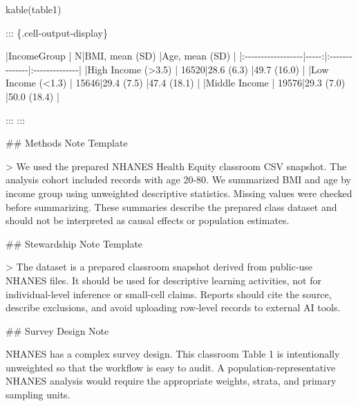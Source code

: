 \documentclass[
  letterpaper,
  DIV=11,
  numbers=noendperiod,
  oneside]{scrreprt}
\newenvironment{Shaded}{\begin{snugshade}}{\end{snugshade}}
\newcommand{\AttributeTok}[1]{\textcolor[rgb]{0.40,0.45,0.13}{#1}}
\newcommand{\FunctionTok}[1]{\textcolor[rgb]{0.28,0.35,0.67}{#1}}
\newcommand{\InformationTok}[1]{\textcolor[rgb]{0.37,0.37,0.37}{#1}}
\newcommand{\NormalTok}[1]{\textcolor[rgb]{0.00,0.23,0.31}{#1}}
\newcommand{\PreprocessorTok}[1]{\textcolor[rgb]{0.68,0.00,0.00}{#1}}
\begin{document}
\begin{Shaded}
\begin{Highlighting}[numbers=left,,]
\FunctionTok{kable}\NormalTok{(table1)}
\InformationTok{\textasciigrave{}\textasciigrave{}\textasciigrave{}}

\NormalTok{::: \{.cell{-}output{-}display\}}


\PreprocessorTok{|}\NormalTok{IncomeGroup        }\PreprocessorTok{|}\NormalTok{     N}\PreprocessorTok{|}\NormalTok{BMI, mean (SD) }\PreprocessorTok{|}\NormalTok{Age, mean (SD) }\PreprocessorTok{|}
\PreprocessorTok{|:{-}{-}{-}{-}{-}{-}{-}{-}{-}{-}{-}{-}{-}{-}{-}{-}{-}{-}|{-}{-}{-}{-}{-}:|:{-}{-}{-}{-}{-}{-}{-}{-}{-}{-}{-}{-}{-}{-}|:{-}{-}{-}{-}{-}{-}{-}{-}{-}{-}{-}{-}{-}{-}|}
\PreprocessorTok{|}\NormalTok{High Income (\textgreater{}3.5) }\PreprocessorTok{|}\NormalTok{ 16520}\PreprocessorTok{|}\NormalTok{28.6 (6.3)     }\PreprocessorTok{|}\NormalTok{49.7 (16.0)    }\PreprocessorTok{|}
\PreprocessorTok{|}\NormalTok{Low Income (\textless{}1.3)  }\PreprocessorTok{|}\NormalTok{ 15646}\PreprocessorTok{|}\NormalTok{29.4 (7.5)     }\PreprocessorTok{|}\NormalTok{47.4 (18.1)    }\PreprocessorTok{|}
\PreprocessorTok{|}\NormalTok{Middle Income      }\PreprocessorTok{|}\NormalTok{ 19576}\PreprocessorTok{|}\NormalTok{29.3 (7.0)     }\PreprocessorTok{|}\NormalTok{50.0 (18.4)    }\PreprocessorTok{|}


\NormalTok{:::}
\NormalTok{:::}


\FunctionTok{\#\# Methods Note Template}

\AttributeTok{\textgreater{} We used the prepared NHANES Health Equity classroom CSV snapshot. The analysis cohort included records with age 20{-}80. We summarized BMI and age by income group using unweighted descriptive statistics. Missing values were checked before summarizing. These summaries describe the prepared class dataset and should not be interpreted as causal effects or population estimates.}

\FunctionTok{\#\# Stewardship Note Template}

\AttributeTok{\textgreater{} The dataset is a prepared classroom snapshot derived from public{-}use NHANES files. It should be used for descriptive learning activities, not for individual{-}level inference or small{-}cell claims. Reports should cite the source, describe exclusions, and avoid uploading row{-}level records to external AI tools.}

\FunctionTok{\#\# Survey Design Note}

\NormalTok{NHANES has a complex survey design. This classroom Table 1 is intentionally unweighted so that the workflow is easy to audit. A population{-}representative NHANES analysis would require the appropriate weights, strata, and primary sampling units.}


\end{Highlighting}
\end{Shaded}
\end{document}
